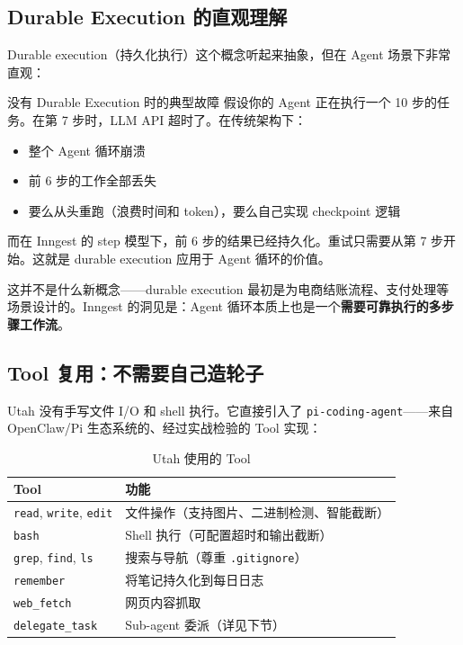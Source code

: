 \subsection{Durable Execution 的直观理解}

Durable execution（持久化执行）这个概念听起来抽象，但在 Agent 场景下非常直观：

\begin{warningbox}{没有 Durable Execution 时的典型故障}
假设你的 Agent 正在执行一个 10 步的任务。在第 7 步时，LLM API 超时了。在传统架构下：
\begin{itemize}
    \item 整个 Agent 循环崩溃
    \item 前 6 步的工作全部丢失
    \item 要么从头重跑（浪费时间和 token），要么自己实现 checkpoint 逻辑
\end{itemize}
而在 Inngest 的 step 模型下，前 6 步的结果已经持久化。重试只需要从第 7 步开始。这就是 durable execution 应用于 Agent 循环的价值。
\end{warningbox}

这并不是什么新概念——durable execution 最初是为电商结账流程、支付处理等场景设计的。Inngest 的洞见是：Agent 循环本质上也是一个\textbf{需要可靠执行的多步骤工作流}。

\subsection{Tool 复用：不需要自己造轮子}

Utah 没有手写文件 I/O 和 shell 执行。它直接引入了 \texttt{pi-coding-agent}——来自 OpenClaw/Pi 生态系统的、经过实战检验的 Tool 实现：

\begin{table}[H]
\centering
\caption{Utah 使用的 Tool}
\begin{tabular}{ll}
\toprule
\textbf{Tool} & \textbf{功能} \\
\midrule
\texttt{read}, \texttt{write}, \texttt{edit} & 文件操作（支持图片、二进制检测、智能截断） \\
\texttt{bash} & Shell 执行（可配置超时和输出截断） \\
\texttt{grep}, \texttt{find}, \texttt{ls} & 搜索与导航（尊重 \texttt{.gitignore}） \\
\texttt{remember} & 将笔记持久化到每日日志 \\
\texttt{web\_fetch} & 网页内容抓取 \\
\texttt{delegate\_task} & Sub-agent 委派（详见下节） \\
\bottomrule
\end{tabular}
\end{table}

